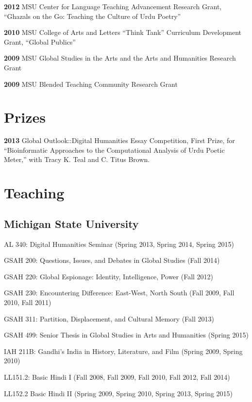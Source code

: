 \documentclass[letterpaper,12pt]{article}
\begin{document}
\textbf{2012}
MSU Center for Language Teaching Advancement Research Grant,
“Ghazals on the Go: Teaching the Culture of Urdu Poetry”

\textbf{2010}
MSU College of Arts and Letters “Think Tank” Curriculum Development Grant,
“Global Publics”

\textbf{2009} MSU Global Studies in the Arts and the Arts and Humanities Research Grant

\textbf{2009} MSU Blended Teaching Community Research Grant


\section{Prizes%
  \label{prizes}%
}

\textbf{2013}
Global Outlook::Digital Humanities Essay Competition,
First Prize,
for “Bioinformatic Approaches to the Computational Analysis of Urdu Poetic Meter,”
with Tracy K. Teal and C. Titus Brown.


\section{Teaching%
  \label{teaching}%
}


\subsection{Michigan State University%
  \label{michigan-state-university}%
}

AL 340: Digital Humanities Seminar (Spring 2013, Spring 2014, Spring 2015)

GSAH 200: Questions, Issues, and Debates in Global Studies (Fall 2014)

GSAH 220: Global Espionage: Identity, Intelligence, Power (Fall 2012)

GSAH 230: Encountering Difference: East-West, North South (Fall 2009, Fall 2010, Fall 2011)

GSAH 311: Partition, Displacement, and Cultural Memory (Fall 2013)

GSAH 499: Senior Thesis in Global Studies in Arts and Humanities (Spring 2015)

IAH 211B: Gandhi’s India in History, Literature, and Film (Spring 2009, Spring 2010)

LL151.2: Basic Hindi I (Fall 2008, Fall 2009, Fall 2010, Fall 2012, Fall 2014)

LL152.2 Basic Hindi II (Spring 2009, Spring 2010, Spring 2013, Spring 2015)
\end{document}
